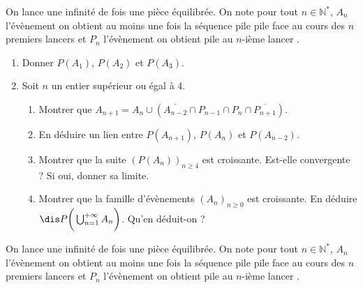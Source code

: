 \documentclass[a4paper,10pt]{report}
\begin{document}
\begin{Exercice}{} On lance une infinité de fois une pièce équilibrée. On note pour tout $n \in \mathbb{N}^*$, $A_n$ l'évènement \og on obtient au moins une fois la séquence pile pile face au cours des $n$ premiers lancers \fg et $P_n$  l'évènement \og on obtient pile au $n$-ième lancer \fg .

\begin{enumerate}
\item Donner $P(A_1)$, $P(A_2)$ et $P(A_3)$.
\item Soit $n$ un entier supérieur ou égal à 4.
\begin{enumerate}
\item Montrer que $A_{n+1} = A_n  \cup (\overline{A_{n-2}} \cap P_{n-1} \cap P_n \cap \overline{P_{n+1}})$.
\item En déduire un lien entre $P(A_{n+1})$, $P(A_n)$ et $P(A_{n-2})$. 
\item Montrer que la suite $(P(A_n))_{n \geq 4}$ est croissante. Est-elle convergente ? Si oui, donner sa limite.
\item Montrer que la famille d'évènements $(A_n)_{n \geq 0}$ est croissante. En déduire $\dis P \bigg{(} \bigcup_{n=1}^{+  \infty} A_n \bigg{)}$. Qu'en déduit-on ?
\end{enumerate}
\end{enumerate}
\end{Exercice}

\corr On lance une infinité de fois une pièce équilibrée. On note pour tout $n \in \mathbb{N}^*$, $A_n$ l'évènement \og on obtient au moins une fois la séquence pile pile face au cours des $n$ premiers lancers \fg et $P_n$  l'évènement \og on obtient pile au $n$-ième lancer \fg .
\end{document}
